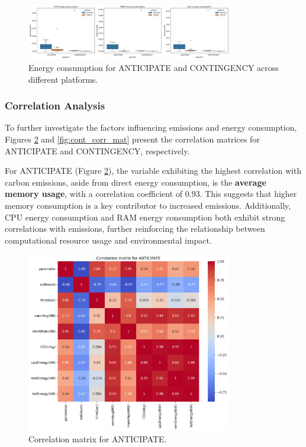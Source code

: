 \documentclass[a4paper,singleside,12pt]{report} %
\begin{document}
\begin{figure}[h!]
    \centering
    \includegraphics[width=0.8\textwidth]{imgs/energy_ant_cont.png}
    \caption{Energy consumption for ANTICIPATE and CONTINGENCY across different platforms.}
    \label{fig:ant_cont_energy}
\end{figure}

\subsubsection{Correlation Analysis}

To further investigate the factors influencing emissions and energy consumption, Figures \ref{fig:ant_corr_mat} and \ref{fig:cont_corr_mat} present the correlation matrices for ANTICIPATE and 
CONTINGENCY, respectively.

For ANTICIPATE (Figure \ref{fig:ant_corr_mat}), the variable exhibiting the highest correlation with carbon emissions, aside from direct energy consumption, is the \textbf{average memory usage}, 
with a correlation coefficient of $0.93$. This suggests that higher memory consumption is a key contributor to increased emissions. Additionally, CPU energy consumption and RAM energy consumption 
both exhibit strong correlations with emissions, further reinforcing the relationship between computational resource usage and environmental impact.

\begin{figure}[h!]
    \centering
    \includegraphics[width=0.8\textwidth]{imgs/ant_corr_mat.png}
    \caption{Correlation matrix for ANTICIPATE.}
    \label{fig:ant_corr_mat}
\end{figure}
\end{document}
